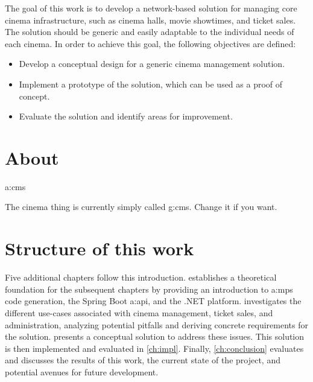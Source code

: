 
The goal of this work is to develop a network-based solution for managing core cinema infrastructure, such as cinema halls, movie showtimes, and ticket sales. The solution should be generic and easily adaptable to the individual needs of each cinema. In order to achieve this goal, the following objectives are defined:

\begin{itemize}
    \item Develop a conceptual design for a generic cinema management solution.
    \item Implement a prototype of the solution, which can be used as a proof of concept.
    \item Evaluate the solution and identify areas for improvement.
\end{itemize}

\section{About }

\gls{a:cms}


The cinema thing is currently simply called \gls{g:cms}. Change it if you want.

\section{Structure of this work}

Five additional chapters follow this introduction.  establishes a theoretical foundation for the subsequent chapters by providing an introduction to \gls{a:mps} code generation, the Spring Boot \gls{a:api}, and the .NET platform.  investigates the different use-cases associated with cinema management, ticket sales, and administration, analyzing potential pitfalls and deriving concrete requirements for the solution.  presents a conceptual solution to address these issues. This solution is then implemented and evaluated in \cref{ch:impl}. Finally, \cref{ch:conclusion} evaluates and discusses the results of this work, the current state of the project, and potential avenues for future development.

